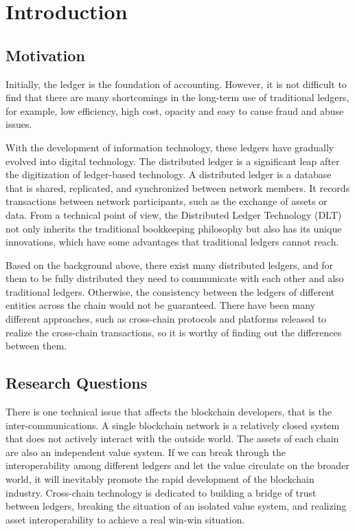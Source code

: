 \chapter{Introduction}
\label{chap:1}

\section{Motivation}

\noindent Initially, the ledger is the foundation of accounting. However, it is not difficult to find that there are many shortcomings in the long-term use of traditional ledgers, for example, low efficiency, high cost, opacity and easy to cause fraud and abuse issues.

\noindent With the development of information technology, these ledgers have gradually evolved into digital technology. The distributed ledger is a significant leap after the digitization of ledger-based technology. A distributed ledger is a database that is shared, replicated, and synchronized between network members\cite{brakeville2016blockchain}. It records transactions between network participants, such as the exchange of assets or data. From a technical point of view, the Distributed Ledger Technology (DLT) not only inherits the traditional bookkeeping philosophy but also has its unique innovations, which have some advantages that traditional ledgers cannot reach.

\noindent Based on the background above, there exist many distributed ledgers, and for them to be fully distributed they need to communicate with each other and also traditional ledgers. Otherwise, the consistency between the ledgers of different entities across the chain would not be guaranteed. There have been many different approaches, such as cross-chain protocols and platforms released to realize the cross-chain transactions, so it is worthy of finding out the differences between them.

\section{Research Questions}

\noindent There is one technical issue that affects the blockchain developers, that is the inter-communications. A single blockchain network is a relatively closed system that does not actively interact with the outside world. The assets of each chain are also an independent value system. If we can break through the interoperability among different ledgers and let the value circulate on the broader world, it will inevitably promote the rapid development of the blockchain industry. Cross-chain technology is dedicated to building a bridge of trust between ledgers, breaking the situation of an isolated value system, and realizing asset interoperability to achieve a real win-win situation.\\

